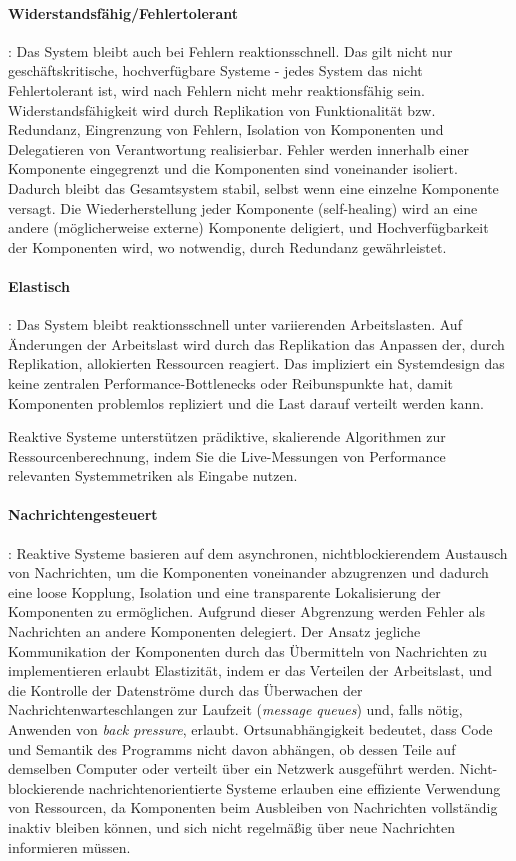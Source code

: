 \paragraph{Widerstandsfähig/Fehlertolerant}: Das System bleibt auch bei Fehlern reaktionsschnell. Das gilt nicht nur geschäftskritische, hochverfügbare Systeme -
jedes System das nicht Fehlertolerant ist, wird nach Fehlern nicht mehr reaktionsfähig sein.
Widerstandsfähigkeit wird durch Replikation von Funktionalität bzw. Redundanz, Eingrenzung von Fehlern, Isolation von Komponenten und
Delegatieren von Verantwortung realisierbar.
Fehler werden innerhalb einer Komponente eingegrenzt und die Komponenten sind voneinander isoliert. Dadurch bleibt das Gesamtsystem stabil, selbst
wenn eine einzelne Komponente versagt.
Die Wiederherstellung jeder Komponente (self-healing) wird an eine andere (möglicherweise externe) Komponente deligiert, und
Hochverfügbarkeit der Komponenten wird, wo notwendig, durch Redundanz gewährleistet.

\paragraph{Elastisch}: Das System bleibt reaktionsschnell unter variierenden Arbeitslasten. Auf Änderungen der Arbeitslast wird durch das Replikation
das Anpassen der, durch Replikation, allokierten Ressourcen reagiert. Das impliziert ein Systemdesign das keine zentralen Performance-Bottlenecks oder
Reibunspunkte hat, damit Komponenten problemlos repliziert und die Last darauf verteilt werden kann.

Reaktive Systeme unterstützen prädiktive, skalierende Algorithmen zur Ressourcenberechnung,
indem Sie die Live-Messungen von Performance relevanten Systemmetriken als Eingabe nutzen.

\paragraph{Nachrichtengesteuert}: Reaktive Systeme basieren auf dem asynchronen, nichtblockierendem Austausch von Nachrichten, um die Komponenten voneinander
abzugrenzen und dadurch eine loose Kopplung, Isolation und eine transparente Lokalisierung der Komponenten zu ermöglichen.
Aufgrund dieser Abgrenzung werden Fehler als Nachrichten an andere Komponenten delegiert.
Der Ansatz jegliche Kommunikation der Komponenten durch das Übermitteln von Nachrichten zu implementieren erlaubt Elastizität,
indem er das Verteilen der Arbeitslast, und die Kontrolle der Datenströme durch das Überwachen der Nachrichtenwarteschlangen zur Laufzeit
(\textit{message queues}) und, falls nötig, Anwenden von \textit{back pressure}, erlaubt.
Ortsunabhängigkeit bedeutet, dass Code und Semantik des Programms nicht davon abhängen, ob dessen Teile auf demselben Computer
oder verteilt über ein Netzwerk ausgeführt werden.
Nicht-blockierende nachrichtenorientierte Systeme erlauben eine effiziente Verwendung von Ressourcen, da Komponenten beim Ausbleiben von
Nachrichten vollständig inaktiv bleiben können, und sich nicht regelmäßig über neue Nachrichten informieren müssen.\parencite{ReactiveSystems}

